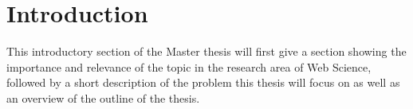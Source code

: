 
\chapter{Introduction} %
\label{cha:introduction}

This introductory section of the Master thesis will first give a section showing the importance and relevance of the topic in the research area of Web Science,
followed by a short description of the problem this thesis will focus on as well as an overview of the outline of the thesis.







